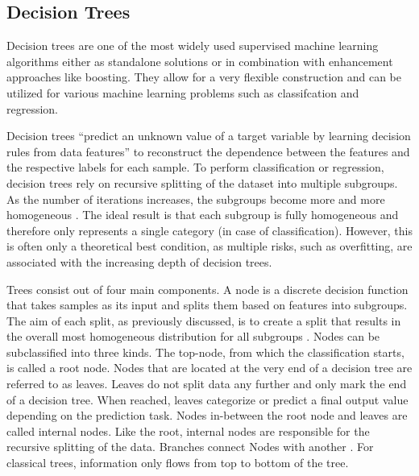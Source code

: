 \subsection{Decision Trees}

Decision trees are one of the most widely used supervised machine learning algorithms either 
as standalone solutions or in combination with enhancement approaches like boosting. 
They allow for a very flexible construction and can be utilized for various machine learning problems
such as classifcation and regression.

Decision trees “predict an unknown value of a target variable by learning decision rules from 
data features” to reconstruct the dependence between the features and the respective labels for 
each sample. To perform classification or regression, decision trees rely on recursive 
splitting of the dataset into multiple subgroups. As the number of iterations increases, the 
subgroups become more and more homogeneous \cite[p.330]{James2021}. The ideal result is that each subgroup is fully 
homogeneous and therefore only represents a single category (in case of classification). However, 
this is often only a theoretical best condition, as multiple risks, such as overfitting, are 
associated with the increasing depth of decision trees.

Trees consist out of four main components. A node is a discrete decision function that takes 
samples as its input and splits them based on features into subgroups. The aim of each split, 
as previously discussed, is to create a split that results in the overall most homogeneous 
distribution for all subgroups \cite[p.6]{lewis2000introduction}. Nodes can be subclassified into three kinds. The top-node, 
from which the classification starts, is called a root node. Nodes that are located at the 
very end of a decision tree are referred to as leaves. Leaves do not split data any further and 
only mark the end of a decision tree. When reached, leaves categorize or predict a final output 
value depending on the prediction task. Nodes in-between the root node and leaves are called 
internal nodes. Like the root, internal nodes are responsible for the recursive splitting of 
the data. Branches connect Nodes with another \cite[p.4]{lewis2000introduction}. For classical trees, information only flows from 
top to bottom of the tree.



